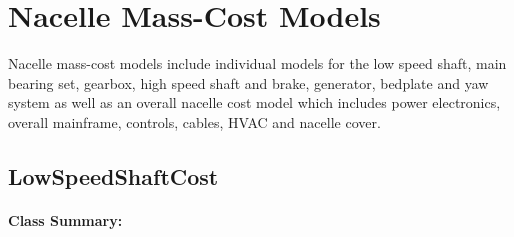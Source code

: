 \documentclass[letterpaper,10pt,openany,oneside]{sphinxmanual}
\begin{document}
\section{Nacelle Mass-Cost Models}
\label{documentation:nacelle-mass-cost-models}
Nacelle mass-cost models include individual models for the low speed shaft, main bearing set, gearbox, high speed shaft and brake, generator, bedplate and yaw system as well as an overall nacelle cost model which includes power electronics, overall mainframe, controls, cables, HVAC and nacelle cover.


\subsection{LowSpeedShaftCost}
\label{documentation:lowspeedshaftcost}\label{documentation:lowspeedshaftcost-class-label}\paragraph{Class Summary:}
\end{document}
